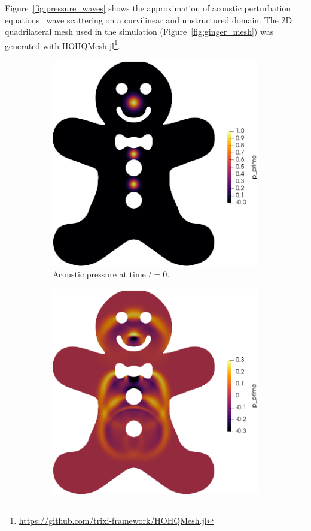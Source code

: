 \documentclass[hidelinks]{juliacon} %
\begin{document}
Figure~\ref{fig:pressure_waves} shows the approximation
of acoustic perturbation equations~\cite{ewert2003acoustic} wave scattering on a
curvilinear and unstructured domain. The 2D quadrilateral mesh used in the simulation
(Figure~\ref{fig:ginger_mesh}) was generated with
HOHQMesh.jl\xspace\footnote{\url{https://github.com/trixi-framework/HOHQMesh.jl}}.
\begin{figure}[!h]
  \begin{subfigure}{0.475\linewidth}
    \includegraphics[width=\textwidth]{../figures/ginger_time_00}
    \caption{Acoustic pressure at time $t = 0$.}
  \end{subfigure}%
  \hspace*{\fill}
  \begin{subfigure}{0.475\linewidth}
    \includegraphics[width=\textwidth]{../figures/ginger_time_08}

\end{subfigure}
\end{figure}
\end{document}
